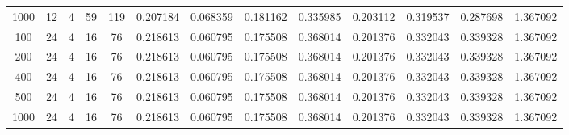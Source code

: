 \begin{table}[h]
\begin{tabular}{ccccccccccccc}
1000 & 12 & 4 & 59 & 119 & 0.207184 & 0.068359 & 0.181162 & 0.335985 & 0.203112 & 0.319537 & 0.287698 & 1.367092 \\
100 & 24 & 4 & 16 & 76 & 0.218613 & 0.060795 & 0.175508 & 0.368014 & 0.201376 & 0.332043 & 0.339328 & 1.367092 \\
200 & 24 & 4 & 16 & 76 & 0.218613 & 0.060795 & 0.175508 & 0.368014 & 0.201376 & 0.332043 & 0.339328 & 1.367092 \\
400 & 24 & 4 & 16 & 76 & 0.218613 & 0.060795 & 0.175508 & 0.368014 & 0.201376 & 0.332043 & 0.339328 & 1.367092 \\
500 & 24 & 4 & 16 & 76 & 0.218613 & 0.060795 & 0.175508 & 0.368014 & 0.201376 & 0.332043 & 0.339328 & 1.367092 \\
1000 & 24 & 4 & 16 & 76 & 0.218613 & 0.060795 & 0.175508 & 0.368014 & 0.201376 & 0.332043 & 0.339328 & 1.367092 \\
\bottomrule
\end{tabular}
\end{table}
